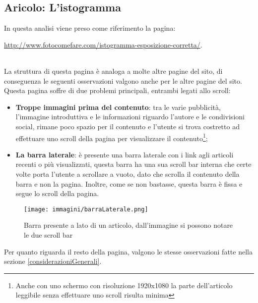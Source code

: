 \subsection{Aricolo: L'istogramma}\label{istogramma}
In questa analisi viene preso come riferimento la pagina: \\
\begin{small}
\url{http://www.fotocomefare.com/istogramma-esposizione-corretta/}.
\end{small}
\\
La struttura di questa pagina è analoga a molte altre pagine del sito, di conseguenza le seguenti osservazioni valgono anche per le altre pagine del sito.\\
Questa pagina soffre di due problemi principali, entrambi legati allo scroll:
\begin{itemize}
\item \textbf{Troppe immagini prima del contenuto}: tra le varie pubblicità, l'immagine introduttiva e le informazioni riguardo l'autore e le condivisioni social, rimane poco spazio per il contenuto e l'utente si trova costretto ad effettuare uno scroll della pagina per visualizzare il contenuto\footnote{Anche con uno schermo con risoluzione 1920x1080 la parte dell'articolo leggibile senza effettuare uno scroll risulta minima};
\item \textbf{La barra laterale}: è presente una barra laterale con i link agli articoli recenti o più visualizzati, questa barra ha una sua scroll bar interna che certe volte porta l'utente a scrollare a vuoto, dato che scrolla il contenuto della barra e non la pagina. Inoltre, come se non bastasse, questa barra è fissa e segue lo scroll della pagina.
\end{itemize}

\begin{figure}[htpb]
\begin{center}
\texttt{[image: immagini/barraLaterale.png]}
\caption{Barra presente a lato di un articolo, dall'immagine si possono notare le due scroll bar}
\label{barraLaterale}
\end{center}
\end{figure}
\FloatBarrier

Per quanto riguarda il resto della pagina, valgono le stesse osservazioni fatte nella sezione \ref{considerazioniGenerali}.